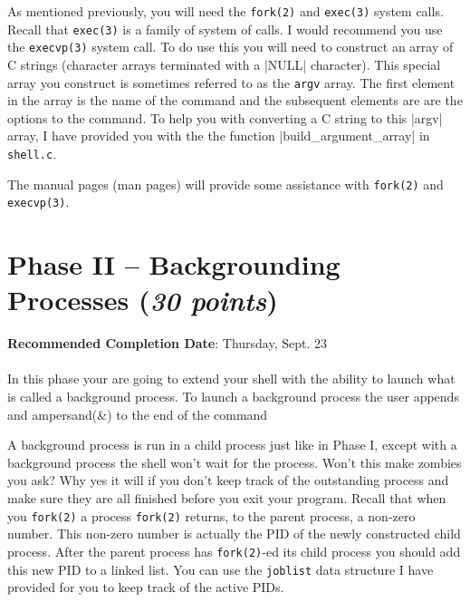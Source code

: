 \documentclass [12pt, letterpaper] {article}
\begin{document}
As mentioned previously, you will need the {\tt fork(2)} and {\tt exec(3)}
system calls. Recall that {\tt exec(3)} is a family of system of calls. I
would recommend you use the {\tt execvp(3)} system call. To do use this you
will need to construct an array of C strings (character arrays terminated
with a \statement|NULL| character). This special array you construct is sometimes
referred to as the {\tt argv} array. The first element in the array
is the name of the command and the subsequent elements are are the options
to the command. To help you with converting a C string to
this \statement|argv| array, I have provided you with the the function
\statement|build_argument_array| in {\tt shell.c}.

The manual pages (man pages) will provide some assistance with {\tt fork(2)}
and {\tt execvp(3)}.

\section*{Phase II -- Backgrounding Processes (\emph{30 points})}
\noindent\textbf{Recommended Completion Date}: Thursday, Sept. 23\\
\\
In this phase your are going to extend your shell with the ability to
launch what is called a background process. To launch a background process
the user appends and ampersand(\&) to the end of the command

A background process is run in a child process just like in Phase I,
except with a background process the shell won't wait for the process.
Won't this make zombies you ask? Why yes it will if you don't keep track
of the outstanding process and make sure they are all finished before you
exit your program.
Recall that when you {\tt fork(2)} a process {\tt fork(2)} returns,
to the parent process, a non-zero number. This non-zero number is actually
the PID of the newly constructed child process. After the parent process
has {\tt fork(2)}-ed its child process you should add this new PID to a
linked list. You can use the \texttt{joblist} data structure I have provided
for you to keep track of the active PIDs.
\end{document}
